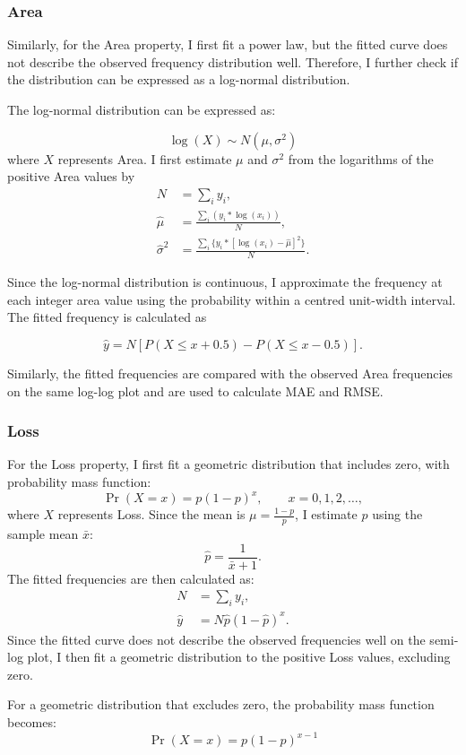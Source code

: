 \subsubsection{Area}
Similarly, for the Area property, I first fit a power law, but the fitted curve does not describe the observed frequency distribution well. Therefore, I further check if the distribution can be expressed as a log-normal distribution. 

The log-normal distribution can be expressed as:

$$\log(X) \sim N(\mu, \sigma^2)$$
where $X$ represents Area. I first estimate $\mu$ and $\sigma^2$ from the logarithms of the positive Area values by 
\begin{align*}
	N &= \sum_{i} y_i,\\[6pt]
	\hat\mu&= \frac{\sum_{i}(y_i * \log(x_i))}{N}, \\[6pt]
	\hat\sigma^2 &= \frac{\sum_{i}\{y_i *[\log(x_i)-\hat\mu]^2\}}{N}.
\end{align*}

 Since the log-normal distribution is continuous, I approximate the frequency at each integer area value using the probability within a centred unit-width interval. The fitted frequency is calculated as

$$\hat{y} = N[P(X \le x+0.5)- P(X\le x-0.5)].$$ 

Similarly, the fitted frequencies are compared with the observed Area frequencies on the same log-log plot and are used to calculate MAE and RMSE.
\subsubsection{Loss}
For the Loss property, I first fit a geometric distribution that includes zero, with probability mass function:
$$\Pr(X=x) = p(1-p)^x, \qquad x=0,1,2,\ldots,$$
where $X$ represents Loss. Since the mean is $\mu = \frac{1-p}{p}$, I estimate $p$ using the sample mean $\bar{x}$:
$$\hat p = \frac{1}{\bar{x}+1}.$$
The fitted frequencies are then calculated as:
\begin{align*}
	N &= \sum_i y_i, \\[6pt]
	\hat y &= N\hat p(1-\hat p)^x.
\end{align*}
Since the fitted curve does not describe the observed frequencies well on the semi-log plot, I then fit a geometric distribution to the positive Loss values, excluding zero.

For a geometric distribution that excludes zero, the probability mass function becomes:
$$\Pr(X=x) = p(1-p)^{x-1}$$

